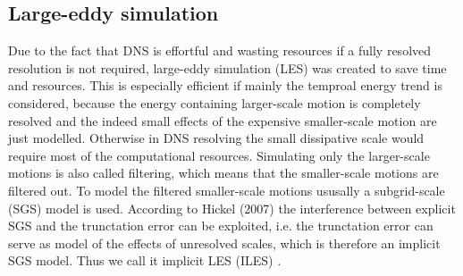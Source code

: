 \documentclass[11pt,a4paper,openany,oneside,parskip=half*]{article}
\begin{document}
\subsection{Large-eddy simulation}
Due to the fact that DNS is effortful and wasting resources if a fully resolved resolution is not required, large-eddy simulation (LES) was created to save time and resources. This is especially efficient if mainly the temproal energy trend is considered, because the energy containing larger-scale motion is completely resolved and the indeed small effects of the expensive smaller-scale motion are just modelled. Otherwise in DNS resolving the small dissipative scale would require most of the computational resources.
\newline
Simulating only the larger-scale motions is also called filtering, which means that the smaller-scale motions are filtered out. To model the filtered smaller-scale motions ususally a subgrid-scale (SGS) model is used. According to Hickel (2007) the interference between explicit SGS and the trunctation error can be exploited, i.e. the trunctation error can serve as model of the effects of unresolved scales, which is therefore an implicit SGS model. Thus we call it implicit LES (ILES) \cite{implicitLES}. %
\end{document}
